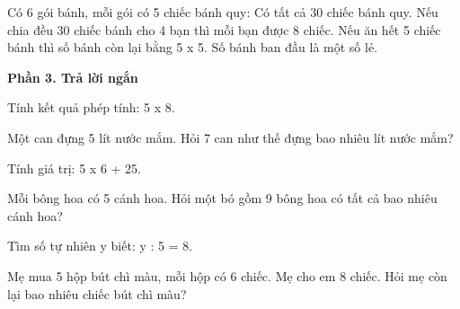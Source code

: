 \begin{ex} %
Có 6 gói bánh, mỗi gói có 5 chiếc bánh quy:
\choiceTF
{\True Có tất cả 30 chiếc bánh quy.}
{Nếu chia đều 30 chiếc bánh cho 4 bạn thì mỗi bạn được 8 chiếc.}
{\True Nếu ăn hết 5 chiếc bánh thì số bánh còn lại bằng 5 x 5.}
{Số bánh ban đầu là một số lẻ.}
\end{ex}

\textbf{Phần 3. Trả lời ngắn}

\begin{ex} %
Tính kết quả phép tính: 5 x 8.
\end{ex}

\begin{ex} %
Một can đựng 5 lít nước mắm. Hỏi 7 can như thế đựng bao nhiêu lít nước mắm?
\end{ex}

\begin{ex} %
Tính giá trị: 5 x 6 + 25.
\end{ex}

\begin{ex} %
Mỗi bông hoa có 5 cánh hoa. Hỏi một bó gồm 9 bông hoa có tất cả bao nhiêu cánh hoa?
\end{ex}

\begin{ex} %
Tìm số tự nhiên y biết: y : 5 = 8.
\end{ex}

\begin{ex} %
Mẹ mua 5 hộp bút chì màu, mỗi hộp có 6 chiếc. Mẹ cho em 8 chiếc. Hỏi mẹ còn lại bao nhiêu chiếc bút chì màu?
\end{ex}
